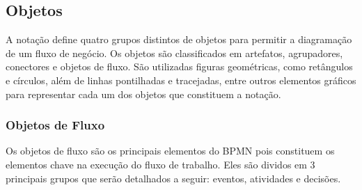 \subsection{Objetos}\label{sec:bpm-bpmn_objetos}

A notação define quatro grupos distintos de objetos para permitir a diagramação de um fluxo de negócio. Os objetos são classificados em artefatos, agrupadores, conectores e objetos de fluxo. São utilizadas figuras geométricas, como retângulos e círculos, além de linhas pontilhadas e tracejadas, entre outros elementos gráficos para representar cada um dos objetos que constituem a notação.

\subsubsection{Objetos de Fluxo}\label{sec:bpm-bpmn_objetos_fluxo}

Os objetos de fluxo são os principais elementos do BPMN pois constituem os elementos chave na execução do fluxo de trabalho. Eles são dividos em 3 principais grupos que serão detalhados a seguir: eventos, atividades e decisões.


